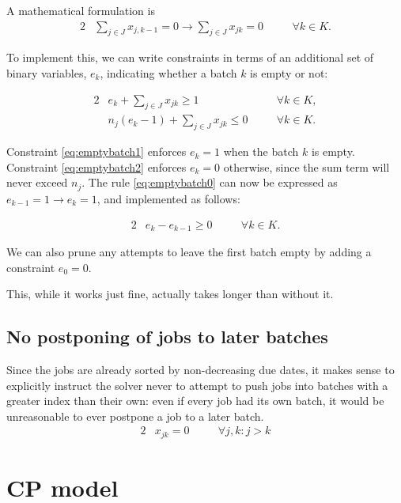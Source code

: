\documentclass[13pt, letterpaper, twoside]{book}
\begin{document}


A mathematical formulation is
\begin{alignat}{2}
& \sum_{j \in J} x_{j,k-1} = 0 \rightarrow \sum_{j \in J} x_{jk} = 0 \quad && \forall k \in K. \label{eq:emptybatch0}
\end{alignat}

To implement this, we can write constraints in terms of an additional  set of binary variables, $e_k$, indicating whether a batch $k$ is empty or not:

\begin{alignat}{2}
& e_k + \sum_{j \in J} x_{jk} \geq 1 \quad && \forall k \in K, \label{eq:emptybatch1} \\
& n_j (e_k-1) + \sum_{j \in J} x_{jk} \leq 0 \quad && \forall k \in K. \label{eq:emptybatch2}
\end{alignat}

Constraint \ref{eq:emptybatch1} enforces $e_k = 1$ when the batch $k$ is empty. Constraint \ref{eq:emptybatch2} enforces $e_k = 0$ otherwise, since the sum term will never exceed $n_j$. The rule \ref{eq:emptybatch0} can now be expressed as $e_{k-1} = 1 \rightarrow e_k = 1$, and implemented as follows:

\begin{alignat}{2}
& e_k - e_{k-1} \geq 0 \quad && \forall k \in K.
\end{alignat}

We can also prune any attempts to leave the first batch empty by adding a constraint $e_0 = 0$.

{\color{darkred} This, while it works just fine, actually takes longer than without it.}

\subsection{No postponing of jobs to later batches}
Since the jobs are already sorted by non-decreasing due dates, it makes sense to explicitly instruct the solver never to attempt to push jobs into batches with a greater index than their own: even if every job had its own batch, it would be unreasonable to ever postpone a job to a later batch.
\begin{alignat}{2}
  & x_{jk} = 0 \quad && \forall j,k : j > k
\end{alignat}



\section{CP model}
\end{document}
